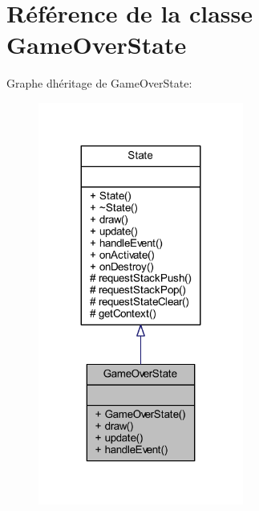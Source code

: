 \hypertarget{class_game_over_state}{}\section{Référence de la classe Game\+Over\+State}
\label{class_game_over_state}


Graphe d\textquotesingle{}héritage de Game\+Over\+State\+:\nopagebreak
\begin{figure}[H]
\begin{center}
\leavevmode
\includegraphics[width=191pt]{class_game_over_state__inherit__graph}
\end{center}
\end{figure}


